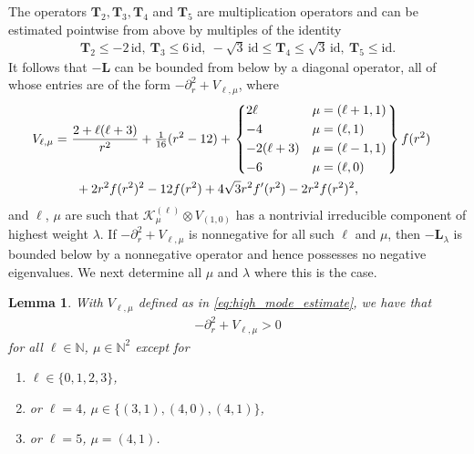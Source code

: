 \documentclass[11pt,reqno]{amsart}
\newtheorem{lemma}{Lemma}[section]
\theoremstyle{remark}
\theoremstyle{definition}
\begin{document}
The operators $\mathbf T_2,\mathbf T_3,\mathbf T_4$ and $\mathbf T_5$ are multiplication operators and can be estimated pointwise from above by multiples of the identity
\begin{align*}
    \mathbf T_2 \leq - 2 \, \mathrm{id}, \ \mathbf T_3 \leq 6 \, \mathrm{id}, \ -\sqrt{3} \, \mathrm{id} \leq \mathbf T_4 \leq \sqrt{3} \, \mathrm{id}, \ \mathbf T_5 \leq \mathrm{id}.
\end{align*}
It follows that $-\mathbf L$ can be bounded from below by a diagonal operator, all of whose entries are of the form $-\partial_r^2 + V_{\ell,\mu}$, where 
\begin{align}
\begin{split}
    \label{eq:high_mode_estimate}
    V_{\ell,\mu} = \ &\frac{2+\ell(\ell+3)}{r^2} + \tfrac1{16}(r^2 - 12) + \begin{rcases}\begin{dcases} 2 \ell & \mu = (\ell+1,1) \\ -4 & \mu = (\ell,1) \\ -2(\ell + 3) & \mu = (\ell-1,1) \\ -6 & \mu = (\ell,0) \end{dcases}\end{rcases} f(r^2)  \\ & \ + 2 r^2 f(r^2)^2 - 12 f(r^2) + 4 \sqrt{3} r^2 f'(r^2) - 2 r^2 f(r^2)^2,
\end{split}
\end{align}
and $\ell$, $\mu$ are such that $\mathcal K^{(\ell)}_\mu \otimes V_{(1,0)}$ has a nontrivial irreducible component of highest weight $\lambda$. If $-\partial_r^2 + V_{\ell,\mu}$ is nonnegative for all such $\ell$ and $\mu$, then $-\mathbf L_\lambda$ is bounded below by a nonnegative operator and hence possesses no negative eigenvalues. We next determine all $\mu$ and $\lambda$ where this is the case.

\begin{lemma}
    \label{lem:high_mode_potential}
    With $V_{\ell,\mu}$ defined as in \eqref{eq:high_mode_estimate}, we have that 
    \begin{align*}
        - \partial_r^2 + V_{\ell,\mu} > 0
    \end{align*}
    for all $\ell \in \mathbb N$, $\mu \in \mathbb N^2$ except for
    \begin{enumerate}
        \item $\ell \in \{0,1,2,3\}$,
        \item or $\ell=4$, $\mu \in \{(3,1),(4,0),(4,1)\}$, 
        \item or $\ell=5$, $\mu = (4,1)$.
    \end{enumerate}
\end{lemma}
\end{document}
